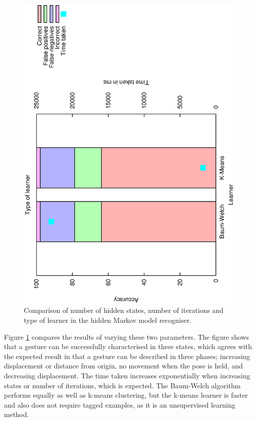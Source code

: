 \documentclass[12pt,a4,notitlepage]{report}
\renewcommand{\_}{\texttt{\symbol{95}}}
\newcommand{\<}{\texttt{\symbol{60}}}
\renewcommand{\>}{\texttt{\symbol{62}}}
\begin{document}
\begin{figure}
\includegraphics[scale=0.4,angle=-90]{results/markov/m_learner.ps}
\caption{Comparison of number of hidden states, number of iterations and type of learner in the hidden Markov model recogniser.}
\label{m_parameters}
\end{figure}

Figure \ref{m_parameters} compares the results of varying these two parameters. The figure shows that a gesture can be successfully characterised in three states, which agrees with the expected result in that a gesture can be described in three phases; increasing displacement or distance from origin, no movement when the pose is held, and decreasing displacement. The time taken increases exponentially when increasing states or number of iterations, which is expected. The Baum-Welch algorithm performs equally as well as k-means clustering, but the k-means learner is faster and also does not require tagged examples, as it is an unsupervised learning method.
\end{document}
